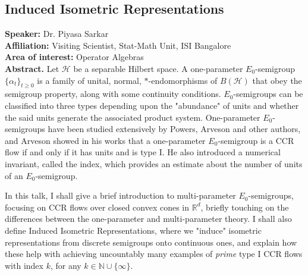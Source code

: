 \subsection*{Induced Isometric Representations} 
\noindent
\textbf{Speaker:} Dr. Piyasa Sarkar \\ 
\textbf{Affiliation:} Visiting Scientist, Stat-Math Unit, ISI Bangalore\\
\textbf{Area of interest:} Operator Algebras\\

\noindent\textbf{Abstract.} Let $\mathcal{H}$ be a separable Hilbert space. A one-parameter $E_0$-semigroup $\{\alpha_t\}_{t \geq 0}$ is a family of unital, normal, $*$-endomorphisms of $B(\mathcal{H})$ that obey the semigroup property, along with some continuity conditions. $E_0$-semigroups can be classified into three types depending upon the "abundance" of units and whether the said units generate the associated product system. One-parameter $E_0$-semigroups have been studied extensively by Powers, Arveson and other authors, and Arveson showed in his works that a one-parameter $E_0$-semigroup is a CCR flow if and only if it has units and is type I. He also introduced a numerical invariant, called the index, which provides an estimate about the number of units of an $E_0$-semigroup.

In this talk, I shall give a brief introduction to multi-parameter $E_0$-semigroups, focusing on CCR flows over closed convex cones in $\mathbb{R}^d$, briefly touching on the differences between the one-parameter and multi-parameter theory. I shall also define Induced Isometric Representations, where we "induce" isometric representations from discrete semigroups onto continuous ones, and explain how these help with achieving uncountably many examples of \emph{prime} type I CCR flows with index $k$, for any $k \in \mathbb{N} \cup \{\infty\}$.


